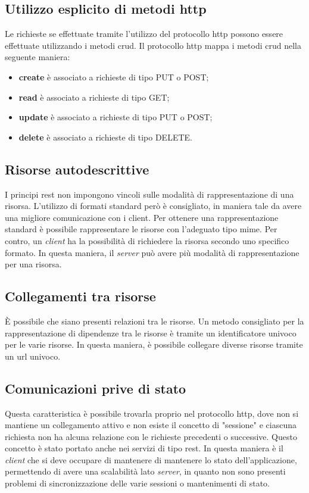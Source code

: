 \subsection{Utilizzo esplicito di metodi \gls{http}}
Le richieste se effettuate tramite l'utilizzo del protocollo \gls{http} possono
essere effettuate utilizzando i metodi \gls{crud}. Il protocollo \gls{http}
mappa i metodi \gls{crud} nella seguente maniera:
\begin{itemize}
  \item \textbf{create} è associato a richieste di tipo PUT o POST;
  \item \textbf{read} è associato a richieste di tipo GET;
  \item \textbf{update} è associato a richieste di tipo PUT o POST;
  \item \textbf{delete} è associato a richieste di tipo DELETE.
\end{itemize}

\subsection{Risorse autodescrittive}
I principi \gls{rest} non impongono vincoli sulle modalità di rappresentazione
di una risorsa. L'utilizzo di formati standard però è consigliato, in maniera
tale da avere una migliore comunicazione con i client. Per ottenere una
rappresentazione standard è possibile rappresentare le risorse con l'adeguato
tipo \gls{mime}.
Per contro, un \textit{client} ha la possibilità di richiedere la risorsa
secondo uno specifico formato. In questa maniera, il \textit{server} può avere
più modalità di rappresentazione per una risorsa.

\subsection{Collegamenti tra risorse}
È possibile che siano presenti relazioni tra le risorse. Un metodo consigliato
per la rappresentazione di dipendenze tra le risorse è tramite un
identificatore univoco per le varie risorse. In questa maniera, è possibile
collegare diverse risorse tramite un \gls{url} univoco.

\subsection{Comunicazioni prive di stato}
Questa caratteristica è possibile trovarla proprio nel protocollo \gls{http},
dove non si mantiene un collegamento attivo e non esiste il concetto di
"sessione" e ciascuna richiesta non ha alcuna relazione con le richieste
precedenti o successive. Questo concetto è stato portato anche nei servizi di
tipo \gls{rest}.
In questa maniera è il \textit{client} che si deve occupare di mantenere di
mantenere lo stato dell'applicazione, permettendo di avere una scalabilità lato
\textit{server}, in quanto non sono presenti problemi di sincronizzazione delle
varie sessioni o mantenimenti di stato.
